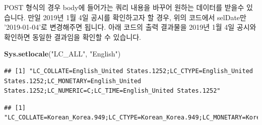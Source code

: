 \documentclass[]{book}
\newenvironment{Shaded}{\begin{snugshade}}{\end{snugshade}}
\newcommand{\DataTypeTok}[1]{\textcolor[rgb]{0.13,0.29,0.53}{#1}}
\newcommand{\DecValTok}[1]{\textcolor[rgb]{0.00,0.00,0.81}{#1}}
\newcommand{\KeywordTok}[1]{\textcolor[rgb]{0.13,0.29,0.53}{\textbf{#1}}}
\newcommand{\NormalTok}[1]{#1}
\newcommand{\OperatorTok}[1]{\textcolor[rgb]{0.81,0.36,0.00}{\textbf{#1}}}
\newcommand{\OtherTok}[1]{\textcolor[rgb]{0.56,0.35,0.01}{#1}}
\newcommand{\StringTok}[1]{\textcolor[rgb]{0.31,0.60,0.02}{#1}}
\begin{document}
POST 형식의 경우 body에 들어가는 쿼리 내용을 바꾸어 원하는 데이터를 받을수 있습니다. 만일 2019년 1월 4일 공시를 확인하고자 할 경우, 위의 코드에서 selDate만 '2019-01-04'로 변경해주면 됩니다. 아래 코드의 출력 결과물을 2019년 1월 4일 공시와 확인하면 동일한 결과임을 확인할 수 있습니다.

\begin{Shaded}
\begin{Highlighting}[]
\KeywordTok{Sys.setlocale}\NormalTok{(}\StringTok{"LC_ALL"}\NormalTok{, }\StringTok{"English"}\NormalTok{)}
\end{Highlighting}
\end{Shaded}

\begin{verbatim}
## [1] "LC_COLLATE=English_United States.1252;LC_CTYPE=English_United States.1252;LC_MONETARY=English_United States.1252;LC_NUMERIC=C;LC_TIME=English_United States.1252"
\end{verbatim}

\begin{Shaded}
\end{Shaded}

\begin{verbatim}
## [1] "LC_COLLATE=Korean_Korea.949;LC_CTYPE=Korean_Korea.949;LC_MONETARY=Korean_Korea.949;LC_NUMERIC=C;LC_TIME=Korean_Korea.949"
\end{verbatim}
\end{document}
